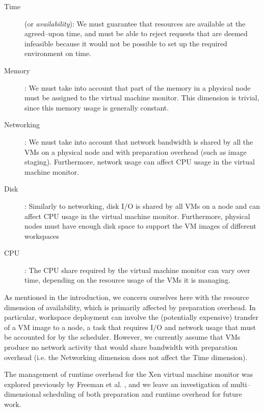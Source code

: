 \begin{description}
\item[Time] (or \emph{availability}): We must guarantee that resources are available at the agreed--upon time, and must be able to reject requests that are deemed infeasible because it would not be possible to set up the required environment on time.
\item[Memory]: We must take into account that part of the memory in a physical node must be assigned to the virtual machine monitor. This dimension is trivial, since this memory usage is generally constant.
\item[Networking]: We must take into account that network bandwidth is shared by all the VMs on a physical node and with preparation overhead (such as image staging). Furthermore, network usage can affect CPU usage in the virtual machine monitor.
\item[Disk]: Similarly to networking, disk I/O is shared by all VMs on a node and can affect CPU usage in the virtual machine monitor. Furthermore, physical nodes must have enough disk space to support the VM images of different workspaces
\item[CPU]: The CPU share required by the virtual machine monitor can vary over time, depending on the resource usage of the VMs it is managing.
\end{description}

As mentioned in the introduction, we concern ourselves here with the resource dimension of availability, which is primarily affected by preparation overhead. In particular, workspace deployment can involve the (potentially expensive) transfer of a VM image to a node, a task that requires I/O and network usage that must be accounted for by the scheduler. However, we currently assume that VMs produce no network activity that would share bandwidth with preparation overhead (i.e. the Networking dimension does not affect the Time dimension).

The management of runtime overhead for the Xen virtual machine monitor was explored previously by Freeman et al. \cite{DBLP:conf/icsoc/FreemanKFRSW06}, and we leave an investigation of multi--dimensional scheduling of both preparation and runtime overhead for future work.
